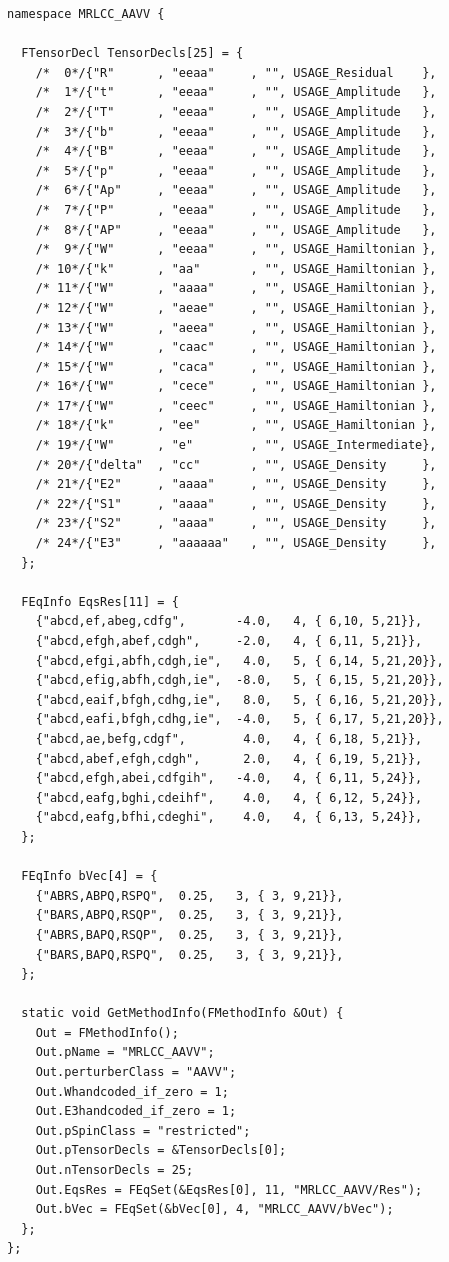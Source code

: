 \documentclass{article}
\begin{document}
\begin{Verbatim}[framesep=3mm,frame=single,framerule=2pt,rulecolor=\color{gray},numberblanklines=false]
namespace MRLCC_AAVV {

  FTensorDecl TensorDecls[25] = {
    /*  0*/{"R"      , "eeaa"     , "", USAGE_Residual    },
    /*  1*/{"t"      , "eeaa"     , "", USAGE_Amplitude   },
    /*  2*/{"T"      , "eeaa"     , "", USAGE_Amplitude   },
    /*  3*/{"b"      , "eeaa"     , "", USAGE_Amplitude   },
    /*  4*/{"B"      , "eeaa"     , "", USAGE_Amplitude   },
    /*  5*/{"p"      , "eeaa"     , "", USAGE_Amplitude   },
    /*  6*/{"Ap"     , "eeaa"     , "", USAGE_Amplitude   },
    /*  7*/{"P"      , "eeaa"     , "", USAGE_Amplitude   },
    /*  8*/{"AP"     , "eeaa"     , "", USAGE_Amplitude   },
    /*  9*/{"W"      , "eeaa"     , "", USAGE_Hamiltonian },
    /* 10*/{"k"      , "aa"       , "", USAGE_Hamiltonian },
    /* 11*/{"W"      , "aaaa"     , "", USAGE_Hamiltonian },
    /* 12*/{"W"      , "aeae"     , "", USAGE_Hamiltonian },
    /* 13*/{"W"      , "aeea"     , "", USAGE_Hamiltonian },
    /* 14*/{"W"      , "caac"     , "", USAGE_Hamiltonian },
    /* 15*/{"W"      , "caca"     , "", USAGE_Hamiltonian },
    /* 16*/{"W"      , "cece"     , "", USAGE_Hamiltonian },
    /* 17*/{"W"      , "ceec"     , "", USAGE_Hamiltonian },
    /* 18*/{"k"      , "ee"       , "", USAGE_Hamiltonian },
    /* 19*/{"W"      , "e"        , "", USAGE_Intermediate},
    /* 20*/{"delta"  , "cc"       , "", USAGE_Density     },
    /* 21*/{"E2"     , "aaaa"     , "", USAGE_Density     },
    /* 22*/{"S1"     , "aaaa"     , "", USAGE_Density     },
    /* 23*/{"S2"     , "aaaa"     , "", USAGE_Density     },
    /* 24*/{"E3"     , "aaaaaa"   , "", USAGE_Density     },
  };

  FEqInfo EqsRes[11] = {
    {"abcd,ef,abeg,cdfg",       -4.0,   4, { 6,10, 5,21}},    
    {"abcd,efgh,abef,cdgh",     -2.0,   4, { 6,11, 5,21}},    
    {"abcd,efgi,abfh,cdgh,ie",   4.0,   5, { 6,14, 5,21,20}}, 
    {"abcd,efig,abfh,cdgh,ie",  -8.0,   5, { 6,15, 5,21,20}}, 
    {"abcd,eaif,bfgh,cdhg,ie",   8.0,   5, { 6,16, 5,21,20}}, 
    {"abcd,eafi,bfgh,cdhg,ie",  -4.0,   5, { 6,17, 5,21,20}}, 
    {"abcd,ae,befg,cdgf",        4.0,   4, { 6,18, 5,21}},    
    {"abcd,abef,efgh,cdgh",      2.0,   4, { 6,19, 5,21}},    
    {"abcd,efgh,abei,cdfgih",   -4.0,   4, { 6,11, 5,24}},    
    {"abcd,eafg,bghi,cdeihf",    4.0,   4, { 6,12, 5,24}},    
    {"abcd,eafg,bfhi,cdeghi",    4.0,   4, { 6,13, 5,24}},    
  };

  FEqInfo bVec[4] = {
    {"ABRS,ABPQ,RSPQ",  0.25,   3, { 3, 9,21}},
    {"BARS,ABPQ,RSQP",  0.25,   3, { 3, 9,21}},
    {"ABRS,BAPQ,RSQP",  0.25,   3, { 3, 9,21}},
    {"BARS,BAPQ,RSPQ",  0.25,   3, { 3, 9,21}},
  };

  static void GetMethodInfo(FMethodInfo &Out) {
    Out = FMethodInfo();
    Out.pName = "MRLCC_AAVV";
    Out.perturberClass = "AAVV";
    Out.Whandcoded_if_zero = 1;
    Out.E3handcoded_if_zero = 1;
    Out.pSpinClass = "restricted";
    Out.pTensorDecls = &TensorDecls[0];
    Out.nTensorDecls = 25;
    Out.EqsRes = FEqSet(&EqsRes[0], 11, "MRLCC_AAVV/Res");
    Out.bVec = FEqSet(&bVec[0], 4, "MRLCC_AAVV/bVec");
  };
};
\end{Verbatim}
\end{document}
